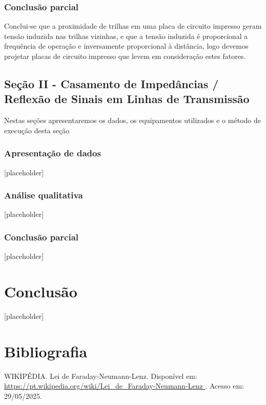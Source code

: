 \documentclass[12pt]{article}
\begin{document}
\subsubsection{Conclusão parcial}

Conclui-se que a proximidade de trilhas em uma placa de circuito
impresso geram tensão induzida nas trilhas vizinhas, e que a tensão
induzida é proporcional a frequência de operação e inversamente
proporcional à distância, logo devemos projetar placas de circuito
impresso que levem em consideração estes fatores.

\subsection{Seção II - Casamento de Impedâncias / Reflexão de Sinais
em Linhas de Transmissão}
Nestas seções apresentaremos os dados, os equipamentos utilizados e o
método de execução desta seção

\subsubsection{Apresentação de dados}
[placeholder]

\subsubsection{Análise qualitativa}
[placeholder]

\subsubsection{Conclusão parcial}
[placeholder]

\section{Conclusão}
[placeholder]

\section{Bibliografia}
WIKIPÉDIA. Lei de Faraday-Neumann-Lenz. Disponível em:
\url{https://pt.wikipedia.org/wiki/Lei_de_Faraday-Neumann-Lenz } .
Acesso em: 29/05/2025.


\clearpage %
\appendix  %
\end{document}
